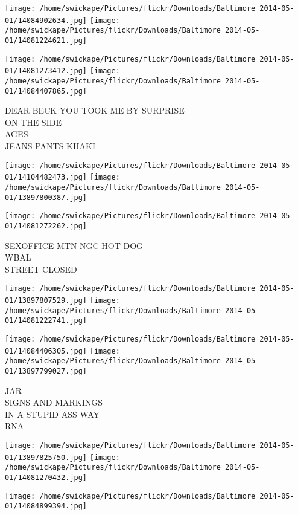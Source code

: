 \documentclass[10pt,letterpaper]{article}
\begin{document}
\texttt{[image: /home/swickape/Pictures/flickr/Downloads/Baltimore 2014-05-01/14084902634.jpg]}
\texttt{[image: /home/swickape/Pictures/flickr/Downloads/Baltimore 2014-05-01/14081224621.jpg]}

\texttt{[image: /home/swickape/Pictures/flickr/Downloads/Baltimore 2014-05-01/14081273412.jpg]}
\texttt{[image: /home/swickape/Pictures/flickr/Downloads/Baltimore 2014-05-01/14084407865.jpg]}

DEAR BECK YOU TOOK ME BY SURPRISE\\
ON THE SIDE\\
AGES\\
JEANS PANTS KHAKI
\pagebreak

\texttt{[image: /home/swickape/Pictures/flickr/Downloads/Baltimore 2014-05-01/14104482473.jpg]}
\texttt{[image: /home/swickape/Pictures/flickr/Downloads/Baltimore 2014-05-01/13897800387.jpg]}

\vspace{0.25in}
\texttt{[image: /home/swickape/Pictures/flickr/Downloads/Baltimore 2014-05-01/14081272262.jpg]}

SEXOFFICE MTN NGC HOT DOG\\
WBAL\\
STREET CLOSED
\pagebreak

\texttt{[image: /home/swickape/Pictures/flickr/Downloads/Baltimore 2014-05-01/13897807529.jpg]}
\texttt{[image: /home/swickape/Pictures/flickr/Downloads/Baltimore 2014-05-01/14081222741.jpg]}

\texttt{[image: /home/swickape/Pictures/flickr/Downloads/Baltimore 2014-05-01/14084406305.jpg]}
\texttt{[image: /home/swickape/Pictures/flickr/Downloads/Baltimore 2014-05-01/13897799027.jpg]}

JAR\\
SIGNS AND MARKINGS\\
IN A STUPID ASS WAY\\
RNA
\pagebreak

\texttt{[image: /home/swickape/Pictures/flickr/Downloads/Baltimore 2014-05-01/13897825750.jpg]}
\texttt{[image: /home/swickape/Pictures/flickr/Downloads/Baltimore 2014-05-01/14081270432.jpg]}

\texttt{[image: /home/swickape/Pictures/flickr/Downloads/Baltimore 2014-05-01/14084899394.jpg]}
\end{document}
